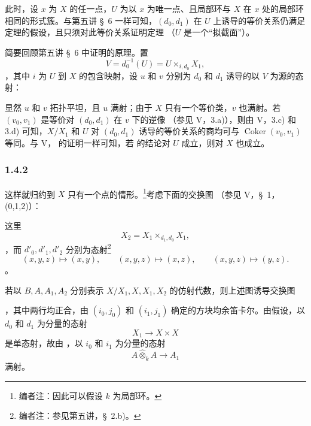 此时，设 \(x\) 为 \(X\) 的任一点，\(U\) 为以 \(x\) 为唯一点、且局部环与 \(X\) 在 \(x\) 处的局部环相同的形式簇。与第五讲 \S~6 一样可知，\((d_0,d_1)\) 在 \(U\) 上诱导的等价关系仍满足定理的假设，且只须对此等价关系证明定理 \textup{（\(U\) 是一个“拟截面”）}。

简要回顾第五讲 \S~6 中证明的原理。置 \[
  V=d_0^{-1}(U)=U\times_{i,d_0}X_1,
\]，其中 \(i\) 为 \(U\) 到 \(X\) 的包含映射，设 \(u\) 和 \(v\) 分别为 \(d_0\) 和 \(d_1\) 诱导的以 \(V\) 为源的态射：\begin{center} \label{sga3:VIIB:1.4.1:quasisection-span} \end{center}显然 \(u\) 和 \(v\) 拓扑平坦，且 \(u\) 满射；由于 \(X\) 只有一个等价类，\(v\) 也满射。若 \((v_0,v_1)\) 是等价对 \((d_0,d_1)\) 在 \(v\) 下的逆像 \textup{（参见 V，3.a)）}，则由 V，3.c) 和 3.d) 可知，\(X/X_1\) 和 \(U\) 对 \((d_0,d_1)\) 诱导的等价关系的商均可与 \(\operatorname{Coker}(v_0,v_1)\) 等同。与 V， 的证明一样可知，若  的结论对 \(U\) 成立，则对 \(X\) 也成立。

\subsubsection*{1.4.2}
\label{sga3:VIIB:1.4.2}

这样就归约到 \(X\) 只有一个点的情形。\footnote{\label{sga3:VIIB:nde:67}编者注：因此可以假设 \(k\) 为局部环。}考虑下面的交换图 \textup{（参见 V，\S~1，\textup{(0,1,2)}）}：\begin{center} \label{sga3:VIIB:1.4.2:equivalence-groupoid-diagram} \end{center}这里 \[
  X_2=X_1\times_{d_1,d_0}X_1,
\]，而 \(d'_0,d'_1,d'_2\) 分别为态射\footnote{\label{sga3:VIIB:nde:68}编者注：参见第五讲，\S~2.b)。}\[
  (x,y,z)\longmapsto(x,y),\qquad
  (x,y,z)\longmapsto(x,z),\qquad
  (x,y,z)\longmapsto(y,z).
\]。

若以 \(B,A,A_1,A_2\) 分别表示 \(X/X_1,X,X_1,X_2\) 的仿射代数，则上述图诱导交换图\begin{center} \label{sga3:VIIB:1.4.2:affine-algebra-diagram} \end{center}，其中两行均正合，由 \((i_0,j_0)\) 和 \((i_1,j_1)\) 确定的方块均余笛卡尔。由假设，以 \(d_0\) 和 \(d_1\) 为分量的态射 \[
  X_1\longrightarrow X\times X
\] 是单态射，故由 ，以 \(i_0\) 和 \(i_1\) 为分量的态射 \[
  A\widehat{\otimes}_k A\longrightarrow A_1
\] 满射。

